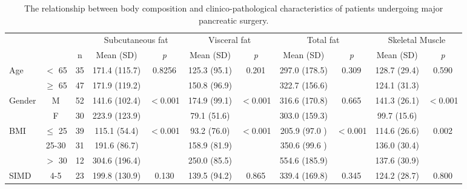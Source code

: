 \begin{sidewaystable}[p]
	\caption{The relationship between body composition and clinico-pathological characteristics of patients undergoing major pancreatic surgery.}
	\label{table:bc_clinical}
	\footnotesize
	\renewcommand{\arraystretch}{1.2} %
	\setlength{\tabcolsep}{9pt} %
	\centering
	\begin{tabular}{|l c c | c c| c c | c c | c c|}
		\hline
		                          &           &    & \multicolumn{2}{c|}{Subcutaneous fat} & \multicolumn{2}{c|}{Visceral fat} & \multicolumn{2}{c|}{Total fat} & \multicolumn{2}{c|}{Skeletal Muscle} \\
		                          &           & n  & Mean (SD)     & \textit{p}            & Mean (SD)     & \textit{p}        & Mean (SD)     & \textit{p}     & Mean (SD)    & \textit{p}            \\ \hline
		Age                       & $<$ 65    & 35 & 171.4 (115.7) & 0.8256                & 125.3 (95.1)  & 0.201             & 297.0 (178.5) & 0.309          & 128.7 (29.4) & 0.590                 \\
		                          & $\geq$ 65 & 47 & 171.9 (119.2) &                       & 150.8 (96.9)  &                   & 322.7 (156.6) &                & 124.1 (31.3) &  \\
		Gender                    & M         & 52 & 141.6 (102.4) & $<$0.001              & 174.9 (99.1)  & $<$0.001          & 316.6 (170.8) & 0.665          & 141.3 (26.1) & $<$0.001              \\
		                          & F         & 30 & 223.9 (123.9) &                       & 79.1 (51.6)   &                   & 303.0 (159.3) &                & 99.7 (15.6)  &  \\
		BMI                       & $\leq$ 25 & 39 & 115.1 (54.4)  & $<$0.001              & 93.2 (76.0)   & $<$0.001          & 205.9 (97.0 ) & $<$0.001       & 114.6 (26.6) & 0.002                 \\
		                          & 25-30     & 31 & 191.6 (86.7)  &                       & 158.9 (81.9)  &                   & 350.6 (99.6 ) &                & 136.0 (30.4) &  \\
		                          & $>$ 30    & 12 & 304.6 (196.4) &                       & 250.0 (85.5)  &                   & 554.6 (185.9) &                & 137.6 (30.9) &  \\
		SIMD                      & 4-5       & 23 & 199.8 (130.9) & 0.130                 & 139.5 (94.2)  & 0.865             & 339.4 (169.8) & 0.345          & 124.2 (28.7) & 0.800                 \\

\end{tabular}
\end{sidewaystable}
